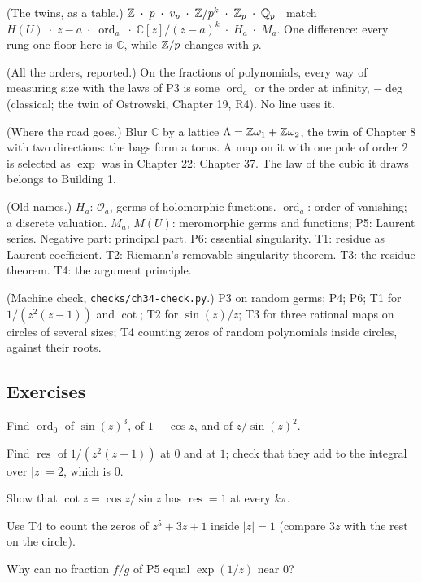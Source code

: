 \begin{lines}
\item[\lab{R1}] (The twins, as a table.) $\mathbb{Z} \;\cdot\; p \;\cdot\; v_p \;\cdot\; \mathbb{Z}/p^k \;\cdot\; \mathbb{Z}_p \;\cdot\; \mathbb{Q}_p$ \ match \ $H(U) \;\cdot\; z - a \;\cdot\; \operatorname{ord}_a \;\cdot\; \mathbb{C}[z]/(z - a)^k \;\cdot\; H_a \;\cdot\; M_a$. One difference: every rung-one floor here is $\mathbb{C}$, while $\mathbb{Z}/p$ changes with $p$.
\item[\lab{R2}] (All the orders, reported.) On the fractions of polynomials, every way of measuring size with the laws of P3 is some $\operatorname{ord}_a$ or the order at infinity, $-\deg$ (classical; the twin of Ostrowski, Chapter 19, R4). No line uses it.
\item[\lab{R3}] (Where the road goes.) Blur $\mathbb{C}$ by a lattice $\Lambda = \mathbb{Z}\omega_1 + \mathbb{Z}\omega_2$, the twin of Chapter 8 with two directions: the bags form a torus. A map on it with one pole of order $2$ is selected as $\exp$ was in Chapter 22: Chapter 37. The law of the cubic it draws belongs to Building 1.
\item[\lab{R4}] (Old names.) $H_a$: $\mathcal{O}_a$, germs of holomorphic functions. $\operatorname{ord}_a$: order of vanishing; a discrete valuation. $M_a$, $M(U)$: meromorphic germs and functions; P5: Laurent series. Negative part: principal part. P6: essential singularity. T1: residue as Laurent coefficient. T2: Riemann's removable singularity theorem. T3: the residue theorem. T4: the argument principle.
\item[\lab{R5}] (Machine check, \texttt{checks/ch34-check.py}.) P3 on random germs; P4; P6; T1 for $1/(z^2(z - 1))$ and $\cot$; T2 for $\sin(z)/z$; T3 for three rational maps on circles of several sizes; T4 counting zeros of random polynomials inside circles, against their roots.
\end{lines}

\subsection*{Exercises}

\begin{lines}
\item[\lab{E1}] Find $\operatorname{ord}_0$ of $\sin(z)^3$, of $1 - \cos z$, and of $z / \sin(z)^2$.
\item[\lab{E2}] Find $\operatorname{res}$ of $1/(z^2(z - 1))$ at $0$ and at $1$; check that they add to the integral over $|z| = 2$, which is $0$.
\item[\lab{E3}] Show that $\cot z = \cos z / \sin z$ has $\operatorname{res} = 1$ at every $k\pi$.
\item[\lab{E4}] Use T4 to count the zeros of $z^5 + 3z + 1$ inside $|z| = 1$ (compare $3z$ with the rest on the circle).
\item[\lab{E5}] Why can no fraction $f/g$ of P5 equal $\exp(1/z)$ near $0$?
\end{lines}
\newpage

